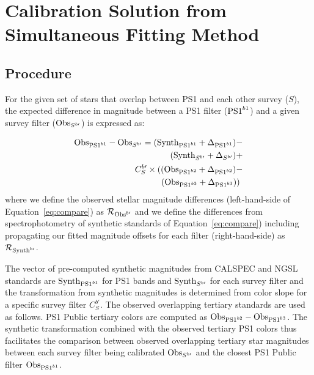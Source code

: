 \documentclass[twocolumn]{aastex63}
\newcommand{\blue}{\color{black}}
\begin{document}
\section{Calibration Solution from Simultaneous Fitting Method}


\subsection{Procedure}

{\blue For the given set of stars that overlap between PS1 and each other survey ($S$), the expected difference in magnitude between a PS1 filter (${\rm PS1}^{b1}$) and a given survey filter (${\rm Obs}_{S^{b\prime}}$) is expressed as:

\begin{equation}
\begin{aligned}
    {\rm Obs}_{{\rm PS1}^{b1}}-{\rm Obs}_{S^{b\prime}} =  ({\rm Synth}_{{\rm PS1}^{b1}} + \Delta_{{\rm PS1}^{b1}}) - \\
    ({\rm Synth}_{S^{b\prime}} + \Delta_{S^{b\prime}}) + \\
    C_S^{b\prime}\times(({\rm Obs}_{{\rm PS1}^{b2}} + \Delta_{{\rm PS1}^{b2}}) - \\
    ({\rm Obs}_{{\rm PS1}^{b3}} + \Delta_{{\rm PS1}^{b3}}))~ \\
\end{aligned}
\label{eq:compare}
\end{equation}
{ where we define the observed stellar magnitude differences (left-hand-side of Equation~\ref{eq:compare}) as $\mathcal{R}_{{\rm Obs}^{b\prime}}$ and we define the differences from spectrophotometry of synthetic standards of Equation~\ref{eq:compare}) including propagating our fitted magnitude offsets for each filter (right-hand-side) as $\mathcal{R}_{{\rm Synth}^{b\prime}}$}. 

The vector of pre-computed synthetic magnitudes from CALSPEC and NGSL standards are ${\rm Synth}_{{\rm PS1}^{b1}}$ for PS1 bands and ${\rm Synth}_{S^{b\prime}}$ for each survey filter and the transformation from synthetic magnitudes is determined from color slope for a specific survey filter $C_S^{b\prime}$. The observed overlapping tertiary standards are used as follows. PS1 Public tertiary colors are computed as ${\rm Obs}_{{\rm PS1}^{b2}}-{\rm Obs}_{{\rm PS1}^{b3}}$. The synthetic transformation combined with the observed tertiary PS1 colors thus facilitates the comparison between observed overlapping tertiary star magnitudes between each survey filter being calibrated ${\rm Obs}_{S^{b\prime}}$ and the closest PS1 Public filter ${\rm Obs}_{{\rm PS1}^{b1}}$.}
\end{document}
